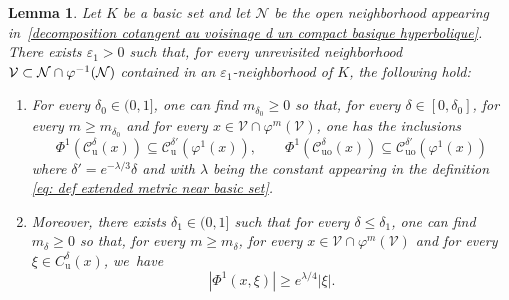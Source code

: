 \documentclass[JEP,XML,SOM,Unicode,NoEqCountersInSection,NoFloatCountersInSection,published]{cedram}
\newenvironment{enumeratei}
{\bgroup\def\theenumi{\roman{enumi}}\def\theenumii{\arabic{enumii}}\begin{enumerate}}
{\end{enumerate}\egroup}
\newcommand{\ru}{\mathrm{u}}
\newcommand{\ruo}{\mathrm{uo}}
\theoremstyle{definition}
\theoremstyle{plain}
\newtheorem{lemma}[definition]{Lemma}
\newcommand{\Ccal}{\mathcal{C}}
\newcommand{\Ncal}{\mathcal{N}}
\newcommand{\Vcal}{\mathcal{V}}
\begin{document}
\begin{lemma}\label{stabilite voisinage conique tilde pour Phi1} Let $K$ be a basic set and let $\Ncal$ be the open neighborhood appearing in~\eqref{decomposition cotangent au voisinage d un compact basique hyperbolique}. There exists $\varepsilon_1 >0$ such that, for every unrevisited neighborhood $\Vcal \subset \Ncal \cap\nobreak\varphi^{-1}(\Ncal)$ contained in an $\varepsilon_1$-neighborhood of $K$, the following hold:
\begin{enumeratei}
\item\label{stabilitei} For every $\delta_0\in(0,1]$, one can find $m_{\delta_0} \geq 0$ so that, for every $\delta\in[0,\delta_0]$, for every $m \geq m_{\delta_0}$ and for every $x\in\mathcal{V}\cap\varphi^{m}(\Vcal)$,
one has the inclusions
\begin{equation}\label{lemma stab vois conique tilde - Unstable inlusions}
\Phi^{1}\left(\Ccal_{\ru}^{\delta}(x)\right) \subseteq \Ccal_{\ru}^{\delta'}(\varphi^{1}(x)), \qquad
\Phi^{1}\left(\Ccal_{\ruo}^{\delta}(x) \right) \subseteq \Ccal_{\ruo}^{\delta'}(\varphi^{1}(x))
\end{equation}
where $\delta' = e^{-\lambda/3} \delta$ and with $\lambda$ being the constant appearing in the definition \eqref{eq: def extended metric near basic set}.
\item\label{stabiliteii} Moreover, there exists $\delta_1\in(0,1]$ such that for every $\delta \leq \delta_1$, one can find $m_{\delta} \geq 0$ so that, for every $m \geq m_\delta$, for every $x \in \Vcal \cap\varphi^{m}(\Vcal)$ and for every $\xi \in C^\delta_\ru(x)$, we~have
\[
|\Phi^1 (x,\xi)| \geq e^{\lambda /4} |\xi|.
\]
\end{enumeratei}
\end{lemma}
\end{document}
